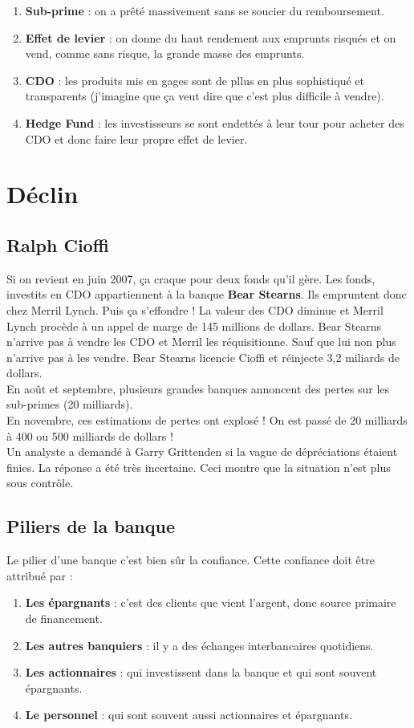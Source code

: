 \begin{enumerate}
\item \textbf{Sub-prime} : on a prêté massivement sans se soucier du remboursement.

\item \textbf{Effet de levier} : on donne du haut rendement aux emprunts risqués et on vend, comme sans risque, la grande masse des emprunts. 

\item \textbf{CDO} : les produits mis en gages sont de pllus en plus sophistiqué et transparents (j'imagine que ça veut dire que c'est plus difficile à vendre).

\item \textbf{Hedge Fund} : les investisseurs se sont endettés à leur tour pour acheter des CDO et donc faire leur propre effet de levier.
\end{enumerate}

\section{Déclin}
\subsection{Ralph Cioffi}
Si on revient en juin 2007, ça craque pour deux fonds qu'il gère. Les fonds, investits en CDO appartiennent à la banque \textbf{Bear Stearns}. Ils empruntent donc chez Merril Lynch. Puis ça s'effondre ! La valeur des CDO diminue et Merril Lynch procède à un appel de marge de 145 millions de dollars. Bear Stearns n'arrive pas à vendre les CDO et Merril les réquisitionne. Sauf que lui non plus n'arrive pas à les vendre. Bear Stearns licencie Cioffi et réinjecte 3,2 miliards de dollars. \\
En août et septembre, plusieurs grandes banques annoncent des pertes sur les sub-primes (20 milliards). \\
En novembre, ces estimations de pertes ont explosé ! On est passé de 20 milliards à 400 ou 500 milliards de dollars ! \\
Un analyste a demandé à Garry Grittenden si la vague de dépréciations étaient finies. La réponse a été très incertaine. Ceci montre que la situation n'est plus sous contrôle. 

\subsection{Piliers de la banque}
Le pilier d'une banque c'est bien sûr la confiance. Cette confiance doit être attribué par : 
\begin{enumerate}
\item \textbf{Les épargnants} : c'est des clients que vient l'argent, donc source primaire de financement.
\item \textbf{Les autres banquiers} : il y a des échanges interbancaires quotidiens.
\item \textbf{Les actionnaires} : qui investissent dans la banque et qui sont souvent épargnants.
\item \textbf{Le personnel} : qui sont souvent aussi actionnaires et épargnants. 
\end{enumerate}

